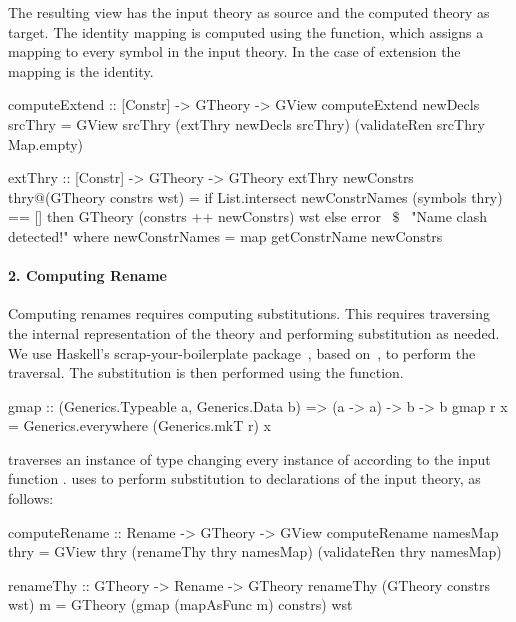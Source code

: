 The resulting view has the input theory as source and the computed theory as target. The identity mapping is computed using the  function, which assigns a mapping to every symbol in the input theory. In the case of extension the mapping is the identity. 
\begin{hscode}
computeExtend :: [Constr] -> GTheory -> GView
computeExtend newDecls srcThry =
  GView srcThry (extThry newDecls srcThry) (validateRen srcThry Map.empty)

extThry :: [Constr] -> GTheory -> GTheory 
extThry newConstrs thry@(GTheory constrs wst) =
  if List.intersect newConstrNames (symbols thry) == []
  then GTheory (constrs ++ newConstrs) wst
  else error ~$\$$~ "Name clash detected!"
    where newConstrNames = map getConstrName newConstrs
\end{hscode}

\paragraph{2. Computing Rename}
Computing renames requires computing substitutions. This requires traversing the internal representation of the theory and performing substitution as needed. We use Haskell's scrap-your-boilerplate package~\cite{syb}, based on~\cite{syb2003Jones}, to perform the traversal. The substitution is then performed using the  function. 
\begin{hscode} 
gmap :: (Generics.Typeable a, Generics.Data b) => (a -> a) -> b -> b
gmap r x = Generics.everywhere (Generics.mkT r) x  
\end{hscode} 
 traverses an instance of type  changing every instance of  according to the input function .  uses  to perform substitution to declarations of the input theory, as follows: 
\begin{hscode}
computeRename :: Rename -> GTheory -> GView  
computeRename namesMap thry =
  GView thry (renameThy thry namesMap) (validateRen thry namesMap)

renameThy :: GTheory -> Rename -> GTheory
renameThy (GTheory constrs wst) m =
  GTheory (gmap (mapAsFunc m) constrs) wst
\end{hscode}

